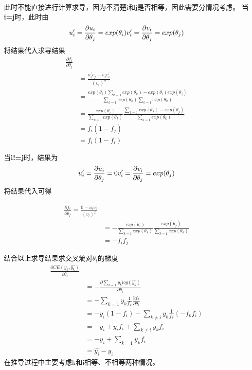 \documentclass[twoside,nofonts,fancyhdr,openany,UTF8,fleqn]{ctexart} %
\begin{document}
此时不能直接进行计算求导，因为不清楚i和j是否相等，因此需要分情况考虑。
当\textbf{i=j}时，此时由
\begin{equation}
u_{i}^{\prime}=\frac{\partial{u_i}}{\partial{\theta_j}}=exp(\theta_i) \\
v_{i}^{\prime}=\frac{\partial{v_i}}{\partial{\theta_j}}=exp(\theta_j)	\\
\end{equation}
将结果代入求导结果
\begin{align}
\frac{\partial{f_i}}{\partial{\theta_j}} 		\\
	& = \frac{u_{i}^{\prime}v_j-u_{i}v_{i}^{\prime}}{(v_i)^2} \\
	& = \frac{exp(\theta_i)\sum_{k=1}{exp(\theta_k)}-exp(\theta_i)exp(\theta_j)}{\sum_{k=1}{exp(\theta_k)}\sum_{k=1}{exp(\theta_k)}}	\\
& = \frac{exp(\theta_i)}{\sum_{k=1}{exp(\theta_k)}}\frac{\sum_{k=1}{exp(\theta_k)}-exp(\theta_j)}{\sum_{k=1}{exp(\theta_k)}} \\
& = f_i(1-f_j) \\
& = f_i(1-f_i)
\end{align}

当\textbf{i!=j}时，结果为
\begin{equation}
u_{i}^{\prime}=\frac{\partial{u_i}}{\partial{\theta_j}}=0 \\
v_{i}^{\prime}=\frac{\partial{v_i}}{\partial{\theta_j}}=exp(\theta_j)	\\
\end{equation}
将结果代入可得

\begin{align}
\frac{\partial{f_i}}{\partial{\theta_j}} = \frac{0-u_{i}v_{i}^{\prime}}{(v_i)^2}	\\
& = - \frac{exp(\theta_i)}{\sum_{k=1}{exp(\theta_k)}}\frac{exp(\theta_j)}{\sum_{k=1}{exp(\theta_k)}}	\\
& = -f_{i}f_j
\end{align}

结合以上求导结果求交叉熵对$\theta_i$的梯度
\begin{align}
\frac{\partial{CE(y_k,\widehat{y_k})}}{\partial{\theta_i}} \\
	& = -\frac{\partial{\sum_{k=1}{y_klog(\widehat{y_k})}}}{\partial{\theta_i}} \\
	& = -\sum_{k=1}y_{k}\frac{1}{f_k}\frac{\partial{f_k}}{\partial{\theta_i}} \\
	& = -y_i(1-f_i)-\sum_{k\neq{i}}y_{k}\frac{1}{f_k}(-f_{k}f_{i})	\\
	& = -y_i + y_{i}f_{i}+\sum_{k\neq{i}}y_{k}f_{i}	\\
	& = -y_i + \sum_{k=1}y_{k}f_{i}	\\
	& = \widehat{y_i} - y_i
\end{align}
在推导过程中主要考虑k和i相等、不相等两种情况。
\end{document}
